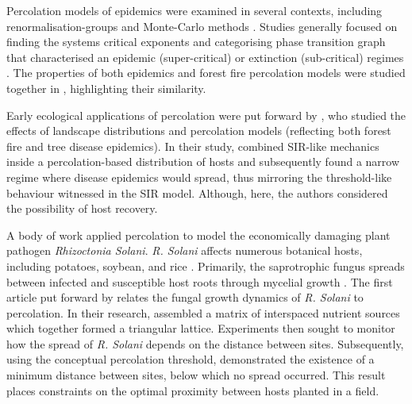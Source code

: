 Percolation models of epidemics were examined in several contexts,
including renormalisation-groups \cite{pub.1060474189} and Monte-Carlo methods \cite{pub.1059069981}. 
Studies generally focused on finding the systems critical exponents and categorising phase
transition graph that characterised an epidemic (super-critical) or extinction (sub-critical) 
regimes \cite{GRASSBERGER1986273}. The properties of both epidemics and forest fire percolation 
models were studied together in \cite{pub.1052857560}, highlighting their similarity.

Early ecological applications of percolation were put forward by \cite{pub.1031591030}, 
who studied the effects of landscape distributions and percolation models 
(reflecting both forest fire and tree disease epidemics). In their study, \cite{pub.1031591030} 
combined SIR-like mechanics inside a percolation-based distribution of hosts and subsequently 
found a narrow regime where disease epidemics would spread, thus mirroring the threshold-like 
behaviour witnessed in the SIR model. Although, here, the authors considered the possibility of host recovery.

A body of work applied percolation to model the economically damaging plant pathogen \textit{Rhizoctonia Solani}. \textit{R. Solani} affects numerous botanical hosts, including potatoes, soybean, and rice \cite{carling1990effect, chela2002characterization, kazempour2004biological, tsror2010biology}. Primarily, the saprotrophic fungus spreads between infected and susceptible host roots through mycelial growth \cite{papavizas1970colonization}. The first article put forward by \cite{bailey2000saprotrophic} relates the fungal growth dynamics of \textit{R. Solani} to percolation.  In their research, \cite{bailey2000saprotrophic} assembled a matrix of interspaced nutrient sources which together formed a triangular lattice. Experiments then sought to monitor how the spread of \textit{R. Solani} depends on the distance between sites. Subsequently, using the conceptual percolation threshold, \cite{bailey2000saprotrophic} demonstrated the existence of a minimum distance between sites, below which no spread occurred. This result places constraints on the optimal proximity between hosts planted in a field.

